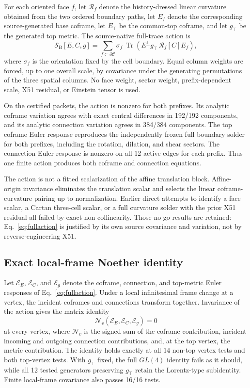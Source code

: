\documentclass[11pt]{article}
\theoremstyle{definition}
\theoremstyle{remark}
\newcommand{\Tr}{\operatorname{Tr}}
\begin{document}
For each oriented face $f$, let $\mathcal R_f$ denote the history-dressed linear curvature obtained from the two ordered boundary paths, let $E_f$ denote the corresponding source-generated base coframe, let $E_\top$ be the common-top coframe, and let $g_\top$ be the generated top metric. The source-native full-trace action is
\begin{equation}\label{eq:fullaction}
 \mathcal S_{\mathrm{B}}[E,C,g]
 =\sum_{f\subset\partial\mathcal C}
 \sigma_f\,\Tr\!\left(E_\top^{\mathsf T}g_\top\,\mathcal R_f[C]E_f\right),
\end{equation}
where $\sigma_f$ is the orientation fixed by the cell boundary. Equal column weights are forced, up to one overall scale, by covariance under the generating permutations of the three spatial columns. No face weight, sector weight, prefix-dependent scale, X51 residual, or Einstein tensor is used.

On the certified packets, the action is nonzero for both prefixes. Its analytic coframe variation agrees with exact central differences in 192/192 components, and its analytic connection variation agrees in 384/384 components. The top coframe Euler response reproduces the independently frozen full boundary solder for both prefixes, including the rotation, dilation, and shear sectors. The connection Euler response is nonzero on all 12 active edges for each prefix. Thus one finite action produces both coframe and connection equations.

The action is not a fitted scalarization of the affine translation block. Affine-origin invariance eliminates the translation scalar and selects the linear coframe-curvature pairing up to normalization. Earlier direct attempts to identify a face scalar, a Cartan three-cell scalar, or a full curvature solder with the prior X51 residual all failed by exact non-collinearity. Those no-go results are retained: Eq.~\eqref{eq:fullaction} is justified by its own source covariance and variation, not by reverse-engineering X51.

\subsection{Exact local-frame Noether identity}

Let $\mathcal E_E$, $\mathcal E_C$, and $\mathcal E_g$ denote the coframe, connection, and top-metric Euler responses of Eq.~\eqref{eq:fullaction}. Under a local infinitesimal frame change at a vertex, the incident coframes and connections transform together. Invariance of the action gives the matrix identity
\begin{equation}\label{eq:noether}
 \mathcal N_v(\mathcal E_E,\mathcal E_C,\mathcal E_g)=0
\end{equation}
at every vertex, where $\mathcal N_v$ is the signed sum of the coframe contribution, incident incoming and outgoing connection contributions, and, at the top vertex, the metric contribution. The identity holds exactly at all 14 non-top vertex tests and both top-vertex tests. With $g_\top$ fixed, the full $GL(4)$ identity fails as it should, while all 12 tested generators preserving $g_\top$ retain the Lorentz-type subidentity. Finite local-frame covariance also passes 16/16 tests.
\end{document}
